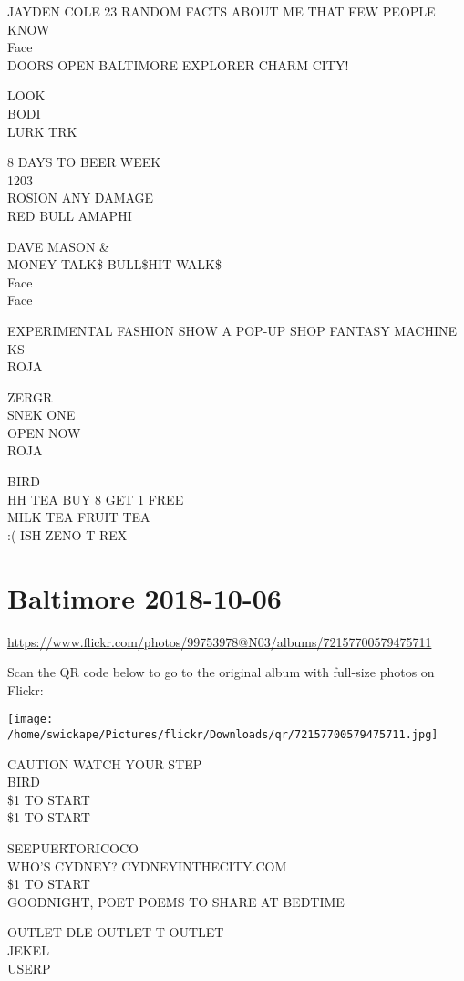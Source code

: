 \documentclass[10pt,letterpaper]{article}
\begin{document}
JAYDEN COLE 23 RANDOM FACTS ABOUT ME THAT FEW PEOPLE KNOW\\
Face\\
DOORS OPEN BALTIMORE EXPLORER CHARM CITY!

LOOK\\
BODI\\
LURK TRK

8 DAYS TO BEER WEEK\\
1203\\
ROSION ANY DAMAGE\\
RED BULL AMAPHI

DAVE MASON \&\\
MONEY TALK\$ BULL\$HIT WALK\$\\
Face\\
Face

EXPERIMENTAL FASHION SHOW A POP{-}UP SHOP FANTASY MACHINE\\
KS\\
ROJA

ZERGR\\
SNEK ONE\\
OPEN NOW\\
ROJA

BIRD\\
HH TEA BUY 8 GET 1 FREE\\
MILK TEA FRUIT TEA\\
:( ISH ZENO T{-}REX
\pagebreak

\section*{Baltimore 2018-10-06}

\url{https://www.flickr.com/photos/99753978@N03/albums/72157700579475711}

Scan the QR code below to go to the original album with full-size photos on Flickr:

\texttt{[image: /home/swickape/Pictures/flickr/Downloads/qr/72157700579475711.jpg]}
\pagebreak

CAUTION WATCH YOUR STEP\\
BIRD\\
\$1 TO START\\
\$1 TO START

SEEPUERTORICOCO\\
WHO'S CYDNEY?  CYDNEYINTHECITY.COM\\
\$1 TO START\\
GOODNIGHT, POET POEMS TO SHARE AT BEDTIME

OUTLET DLE OUTLET T OUTLET\\
JEKEL\\
USERP
\end{document}
